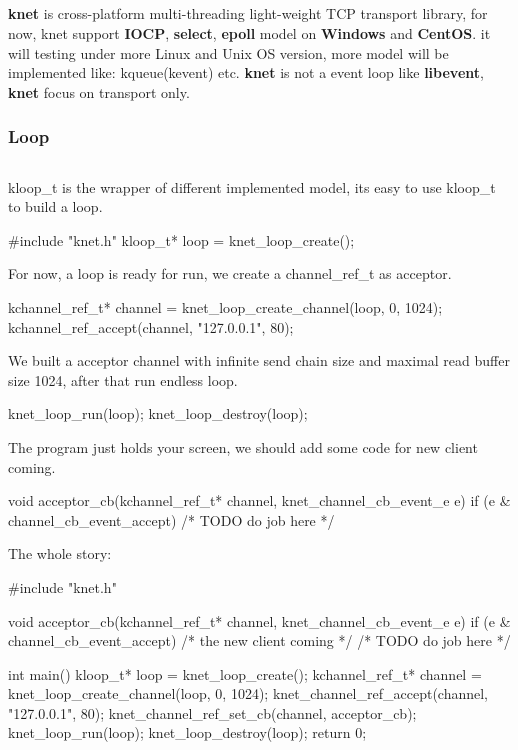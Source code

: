 \subsection*{}

{\bfseries knet} is cross-\/platform multi-\/threading light-\/weight T\+C\+P transport library, for now, knet support {\bfseries I\+O\+C\+P}, {\bfseries select}, {\bfseries epoll} model on {\bfseries Windows} and {\bfseries Cent\+O\+S}. it will testing under more Linux and Unix O\+S version, more model will be implemented like\+: kqueue(kevent) etc. {\bfseries knet} is not a event loop like {\bfseries libevent}, {\bfseries knet} focus on transport only.

\subsubsection*{Loop}

\subsection*{}

{\ttfamily kloop\+\_\+t} is the wrapper of different implemented model, it\textquotesingle{}s easy to use {\ttfamily kloop\+\_\+t} to build a loop. \begin{DoxyVerb}#include "knet.h"
kloop_t* loop = knet_loop_create();
\end{DoxyVerb}


For now, a loop is ready for run, we create a {\ttfamily channel\+\_\+ref\+\_\+t} as acceptor. \begin{DoxyVerb}kchannel_ref_t* channel = knet_loop_create_channel(loop, 0, 1024);
kchannel_ref_accept(channel, "127.0.0.1", 80);
\end{DoxyVerb}


We built a acceptor channel with infinite send chain size and maximal read buffer size 1024, after that run endless loop. \begin{DoxyVerb}knet_loop_run(loop);
knet_loop_destroy(loop);
\end{DoxyVerb}


The program just holds your screen, we should add some code for new client coming. \begin{DoxyVerb}void acceptor_cb(kchannel_ref_t* channel, knet_channel_cb_event_e e) {
    if (e & channel_cb_event_accept) {
        /* TODO do job here */
    }
}
\end{DoxyVerb}


The whole story\+: \begin{DoxyVerb}#include "knet.h"

void acceptor_cb(kchannel_ref_t* channel, knet_channel_cb_event_e e) {
    if (e & channel_cb_event_accept) { /* the new client coming */
        /* TODO do job here */
    }
}

int main() {
    kloop_t* loop = knet_loop_create();
    kchannel_ref_t* channel = knet_loop_create_channel(loop, 0, 1024);
    knet_channel_ref_accept(channel, "127.0.0.1", 80);
    knet_channel_ref_set_cb(channel, acceptor_cb);
    knet_loop_run(loop);
    knet_loop_destroy(loop);
    return 0;
}
\end{DoxyVerb}


